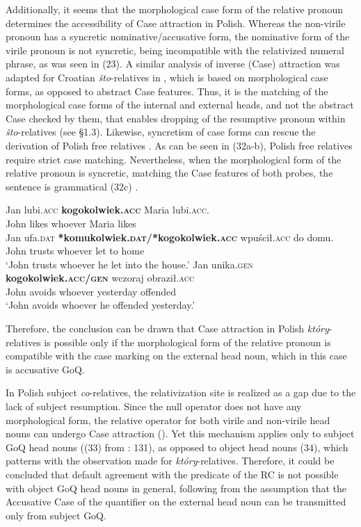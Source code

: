\documentclass[output=paper]{langsci/langscibook}
\begin{document}
Additionally, it seems that the morphological case form of the relative pronoun determines the accessibility of Case attraction in Polish. Whereas the non-virile pronoun has a syncretic nominative\slash accusative form, the nominative form of the virile pronoun is not syncretic, being incompatible with the relativized numeral phrase, as was seen in (23). A similar analysis of inverse (Case) attraction was adapted for Croatian \textit{što}{}-relatives in \citet{Gračanin-Yuksek2013}, which is based on morphological case forms, as opposed to abstract Case features. Thus, it is the matching of the morphological case forms of the internal and external heads, and not the abstract Case checked by them, that enables dropping of the resumptive pronoun within \textit{što}{}-relatives (see §1.3). Likewise, syncretism of case forms can rescue the derivation of Polish free relatives \citep{Assmann2014Matching}. As can be seen in (32a-b), Polish free relatives require strict case matching. Nevertheless, when the morphological form of the relative pronoun is syncretic, matching the Case features of both probes, the sentence is grammatical (32c) \citep[3]{Assmann2014Matching}. 

\ea%
    \label{ex:leska:32}
    \ea
    \gll Jan   lubi.\textsc{acc}   \textbf{kogokolwiek.\textsc{acc}}   Maria lubi.\textsc{acc}.\\
         John   likes     whoever     Maria likes\\
    \ex
    \gll Jan  ufa.\textsc{dat}   \textbf{*komukolwiek.\textsc{dat}}\textbf{/*kogokolwiek.\textsc{acc}} wpuścił.\textsc{acc}   do   domu.\\
         John   trusts     whoever   let     to   home\\
    \glt ‘John trusts whoever he let into the house.’
    \ex
    \gll Jan   unika.\textsc{gen}   \textbf{kogokolwiek.\textsc{acc/gen}} wczoraj   obraził.\textsc{acc}\\
         John   avoids   whoever       yesterday   offended\\
    \glt ‘John avoids whoever he offended yesterday.’
    \z
\z    

Therefore, the conclusion can be drawn that Case attraction in Polish \textit{który}{}-relatives is possible only if the morphological form of the relative pronoun is compatible with the case marking on the external head noun, which in this case is accusative GoQ. 

In Polish subject \textit{co}{}-relatives, the relativization site is realized as a gap due to the lack of subject resumption. Since the null operator does not have any morphological form, the relative operator for both virile and non-virile head nouns can undergo Case attraction (\citealt{Łęska2016}). Yet this mechanism applies only to subject GoQ head nouns ((33) from \citealt{Łęska2016}: 131), as opposed to object head nouns (34), which patterns with the observation made for \textit{który}{}-relatives. Therefore, it could be concluded that default agreement with the predicate of the RC is not possible with object GoQ head nouns in general, following from the assumption that the Accusative Case of the quantifier on the external head noun can be transmitted only from subject GoQ.
 
\end{document}
